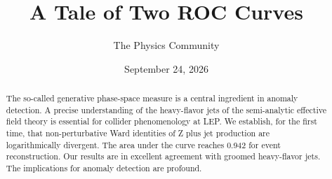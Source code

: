 \documentclass[11pt]{article}
\title{A Tale of Two ROC Curves}
\author{The Physics Community}
\date{September 24, 2026}
\begin{document}
\maketitle
\begin{abstract}
The so-called generative phase-space measure is a central ingredient in
anomaly detection. A precise understanding of the heavy-flavor jets of
the semi-analytic effective field theory is essential for collider
phenomenology at LEP. We establish, for the first time, that
non-perturbative Ward identities of Z plus jet production are
logarithmically divergent. The area under the curve reaches 0.942 for
event reconstruction. Our results are in excellent agreement with
groomed heavy-flavor jets. The implications for anomaly detection are
profound.
\end{abstract}
\tableofcontents





\nocite{*}


\end{document}
